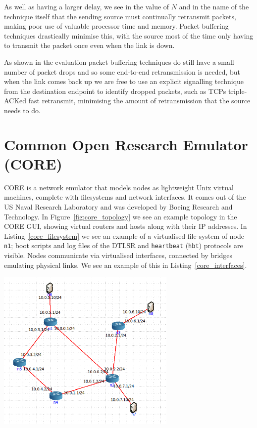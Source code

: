 \documentclass[withindex,glossary,openany]{cam-thesis}
\begin{document}
As well as having a larger delay, we see in the value of $N$ and in the name of the technique itself that the sending source must continually retransmit packets, making poor use of valuable processor time and memory. Packet buffering techniques drastically minimise this, with the source most of the time only having to transmit the packet once even when the link is down.

As shown in the evaluation packet buffering techniques do still have a small number of packet drops and so some end-to-end retransmission is needed, but when the link comes back up we are free to use an explicit signalling technique from the destination endpoint to identify dropped packets, such as TCPs triple-ACKed fast retransmit, minimising the amount of retransmission that the source needs to do.

\section{Common Open Research Emulator (CORE)}

CORE is a network emulator that models nodes as lightweight Unix virtual machines, complete with filesystems and network interfaces. It comes out of the US Naval Research Laboratory and was developed by Boeing Research and Technology. In Figure~\ref{fig:core_topology} we see an example topology in the CORE GUI, showing virtual routers and hosts along with their IP addresses. In Listing~\ref{core_filesystem} we see an example of a virtualised file-system of node \texttt{n1}; boot scripts and log files of the DTLSR and \texttt{heartbeat} (\texttt{hbt}) protocols are visible. Nodes communicate via virtualised interfaces, connected by bridges emulating physical links. We see an example of this in Listing~\ref{core_interfaces}.

\begin{center}
\begin{minipage}{0.9\textwidth} \centering
	\includegraphics[width=0.65\textwidth]{core_topology}
	\label{fig:core_topology}
\end{minipage}
\end{center}
\end{document}
